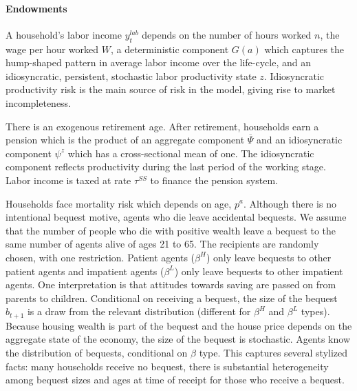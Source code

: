 \documentclass[letterpaper,12pt,dvipsnames,usenames]{article}
\theoremstyle{definition}
\begin{document}
\begin{spacing}{1.25}
\paragraph{Endowments}
A household's labor income $y_t^{lab}$  depends on the number of hours worked $n$, the wage per hour worked $W$, a deterministic component $G(a)$ which captures the hump-shaped pattern in average labor income over the life-cycle, and an idiosyncratic, persistent, stochastic labor productivity state $z$. Idiosyncratic productivity risk is the main source of risk in the model, giving rise to market incompleteness.

There is an exogenous retirement age. After retirement, households earn a pension which is the product of an aggregate component $\overline{\Psi}$ and an idiosyncratic component $\psi^{z}$ which has a cross-sectional mean of one. The idiosyncratic component reflects productivity during the last period of the working stage. Labor income is taxed at rate $\tau^{SS}$ to finance the pension system.

Households face mortality risk which depends on age, $p^{a}$. Although there is no intentional bequest motive, agents who die leave accidental bequests. We assume that the number of people who die with positive wealth leave a bequest to the same number of agents alive of ages 21 to 65. The recipients are randomly chosen, with one restriction. Patient agents ($\beta^H$) only leave bequests to other patient agents and impatient agents ($\beta^L$) only leave bequests to other impatient agents. One interpretation is that attitudes towards saving are passed on from parents to children. Conditional on receiving a bequest, the size of the bequest $\widehat{b}_{t+1}$ is a draw from the relevant distribution (different for $\beta^H$ and $\beta^L$ types). Because housing wealth is part of the bequest and the house price depends on the aggregate state of the economy, the size of the bequest is stochastic. Agents know the distribution of bequests, conditional on $\beta$ type. This captures several stylized facts: many households receive no bequest, there is substantial heterogeneity among bequest sizes and ages at time of receipt for those who receive a bequest.%



\end{spacing}
\end{document}
